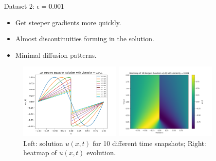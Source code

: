 \begin{secframe}
\begin{block}{Dataset 2: $\epsilon = 0.001$}
\begin{itemize}
  \item \small Get steeper gradients more quickly.
  \item \small Almost discontinuities forming in the solution.
  \item \small Minimal diffusion patterns.
\end{itemize}
\end{block}

\begin{figure}[h!]
    \centering
    \begin{minipage}[t]{0.48\linewidth}
        \centering
        \includegraphics[height=3.8cm]{images/graphical_visualization_1DBurgers_visc_0001.png}
    \end{minipage}\hfill
    \begin{minipage}[t]{0.48\linewidth}
        \centering
        \includegraphics[height=3.8cm]{images/Heatmap_1DBurgers_visc_0001.png}
    \end{minipage}
    \caption{\scriptsize Left: solution $u(x,t)$ for 10 different time snapshots; Right: heatmap of $u(x,t)$ evolution.}
\end{figure}
\end{secframe}

